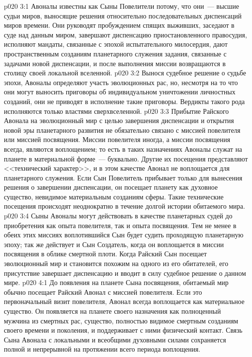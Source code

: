 \vs p020 3:1 Авоналы известны как Сыны Повелители потому, что они~--- высшие судьи миров, выносящие решения относительно последовательных диспенсаций миров времени. Они руководят пробуждением спящих выживших, заседают в суде над данным миром, завершают диспенсацию приостановленного правосудия, исполняют мандаты, связанные с эпохой испытательного милосердия, дают пространственным созданиям планетарного служения задания, связанные с задачами новой диспенсации, и после выполнения миссии возвращаются в столицу своей локальной вселенной.
\vs p020 3:2 Вынося судебное решение о судьбе эпохи, Авоналы определяют участь эволюционных рас, но, несмотря на то что они могут выносить приговоры об индивидуальном уничтожении личностных созданий, они не приводят в исполнение такие приговоры. Вердикты такого рода исполняются только властями сверхвселенной.
\vs p020 3:3 Прибытие Райского Авонала на эволюционный мир с целью завершения диспенсации и открытия новой эры планетарного развития не обязательно связано с миссией повелителя или миссией посвящения. Миссии повелителя иногда, а миссии посвящения всегда, являются воплощением; то есть в таких назначениях Авоналы служат на планете в материальной форме~--- буквально. Другие их посещения представляют <<технический характер>>, и в этом качестве Авонал не воплощается для планетарного служения. Если Сын Повелитель прибывает только для вынесения решения о завершении диспенсации, он посещает планету как духовное существо, невидимое материальным созданиям сферы. Такие технические посещения происходят неоднократно в течение долгой истории обитаемого мира.
\vs p020 3:4 Сыны Авоналы могут действовать в качестве планетарных судей до приобретения как опыта повелителя, так и опыта посвящения. Тем не менее в обеих этих миссиях воплотившийся Сын будет судить проходящую планетарную эпоху; так же действует и Сын Создатель, когда он воплощается в миссии посвящения в облике смертной плоти. Когда Райский Сын посещает эволюционный мир и становится похожим на одного из его обитателей, его присутствие завершает диспенсацию и вводит в силу судебное решение о данном мире.
\vs p020 4:1 До появления на планете Сына посвящения, обитаемый мир обычно посещает Райский Авонал с миссией повелителя. Если это первоначальный визит повелителя, Авонал всегда воплощается как материальное существо. Он появляется на планете своего назначения как полноценный мужчина из смертных рас, существо, полностью видимое смертным созданиям своего времени и поколения, и поддерживает с ними физический контакт. Связь Сына Авонала с локальными и всеобщими духовными силами сохраняется полной и непрерывной на протяжении всего периода воплощения.
